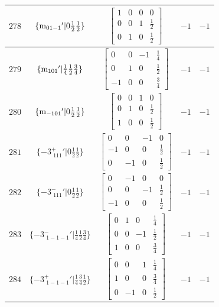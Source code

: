 \documentclass[fleqn,8pt]{jsarticle}
\begin{document}
\begin{longtable}{ccccc}
$ 278 $ & $ \{{\rm m}_{01-1}{}'|0 \frac{1}{2} \frac{1}{2}\} $ & $ \begin{bmatrix} 1 & 0 & 0 & 0 \\ 0 & 0 & 1 & \frac{1}{2} \\ 0 & 1 & 0 & \frac{1}{2} \end{bmatrix} $ & $ -1 $ & $ -1 $ \\ \hline
$ 279 $ & $ \{{\rm m}_{101}{}'|\frac{1}{4} \frac{1}{2} \frac{3}{4}\} $ & $ \begin{bmatrix} 0 & 0 & -1 & \frac{1}{4} \\ 0 & 1 & 0 & \frac{1}{2} \\ -1 & 0 & 0 & \frac{3}{4} \end{bmatrix} $ & $ -1 $ & $ -1 $ \\ \hline
$ 280 $ & $ \{{\rm m}_{-101}{}'|0 \frac{1}{2} \frac{1}{2}\} $ & $ \begin{bmatrix} 0 & 0 & 1 & 0 \\ 0 & 1 & 0 & \frac{1}{2} \\ 1 & 0 & 0 & \frac{1}{2} \end{bmatrix} $ & $ -1 $ & $ -1 $ \\ \hline
$ 281 $ & $ \{-3^{+}_{\,\,111}{}'|0 \frac{1}{2} \frac{1}{2}\} $ & $ \begin{bmatrix} 0 & 0 & -1 & 0 \\ -1 & 0 & 0 & \frac{1}{2} \\ 0 & -1 & 0 & \frac{1}{2} \end{bmatrix} $ & $ -1 $ & $ -1 $ \\ \hline
$ 282 $ & $ \{-3^{-}_{\,\,111}{}'|0 \frac{1}{2} \frac{1}{2}\} $ & $ \begin{bmatrix} 0 & -1 & 0 & 0 \\ 0 & 0 & -1 & \frac{1}{2} \\ -1 & 0 & 0 & \frac{1}{2} \end{bmatrix} $ & $ -1 $ & $ -1 $ \\ \hline
$ 283 $ & $ \{-3^{-}_{\,\,1-1-1}{}'|\frac{1}{4} \frac{1}{2} \frac{3}{4}\} $ & $ \begin{bmatrix} 0 & 1 & 0 & \frac{1}{4} \\ 0 & 0 & -1 & \frac{1}{2} \\ 1 & 0 & 0 & \frac{3}{4} \end{bmatrix} $ & $ -1 $ & $ -1 $ \\ \hline
$ 284 $ & $ \{-3^{+}_{\,\,1-1-1}{}'|\frac{1}{4} \frac{3}{4} \frac{1}{2}\} $ & $ \begin{bmatrix} 0 & 0 & 1 & \frac{1}{4} \\ 1 & 0 & 0 & \frac{3}{4} \\ 0 & -1 & 0 & \frac{1}{2} \end{bmatrix} $ & $ -1 $ & $ -1 $ \\ \hline

\end{longtable}
\end{document}
